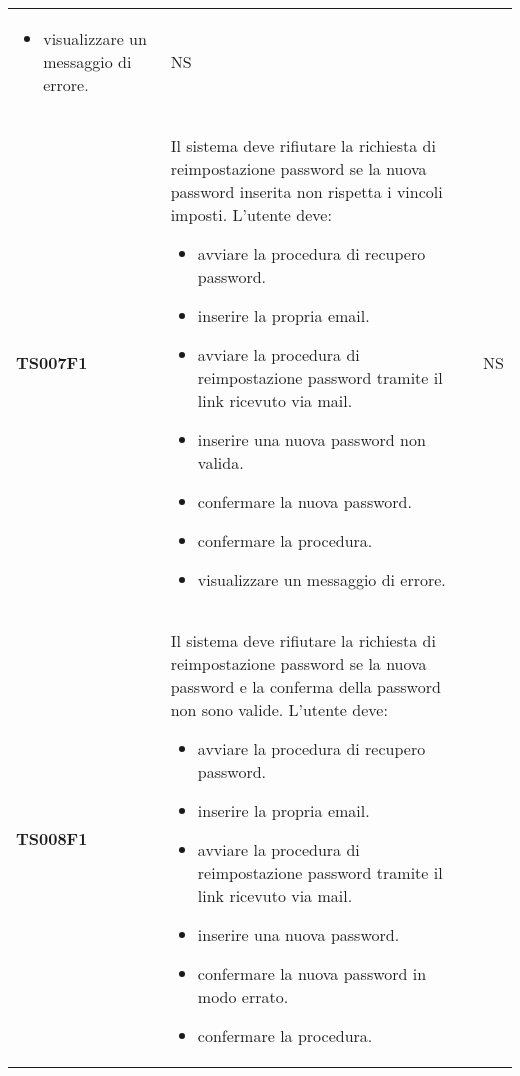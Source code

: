 \documentclass[../piano-di-qualifica.tex]{subfiles}
\begin{document}
\begin{centering}
\begin{longtable}[H]{>{\centering\bfseries}m{3cm} >{}p{10cm} >{\centering\arraybackslash}m{3cm}}
\begin{itemize}
      \item visualizzare un messaggio di errore.
    \end{itemize}
                       & NS                                                                                                                                                                                                                                                               \\
    TS007F1            & Il sistema deve rifiutare la richiesta di reimpostazione password se la nuova password inserita non rispetta i vincoli imposti. \newline
    L'utente deve:
    \begin{itemize}
      \item avviare la procedura di recupero password.
      \item inserire la propria email.
      \item avviare la procedura di reimpostazione password tramite il link ricevuto via mail.
      \item inserire una nuova password non valida.
      \item confermare la nuova password.
      \item confermare la procedura.
      \item visualizzare un messaggio di errore.
    \end{itemize}
                       & NS                                                                                                                                                                                                                                                               \\
    TS008F1            & Il sistema deve rifiutare la richiesta di reimpostazione password se la nuova password e la conferma della password non sono valide. \newline
    L'utente deve:
    \begin{itemize}
      \item avviare la procedura di recupero password.
      \item inserire la propria email.
      \item avviare la procedura di reimpostazione password tramite il link ricevuto via mail.
      \item inserire una nuova password.
      \item confermare la nuova password in modo errato.
      \item confermare la procedura.

\end{itemize}
\end{longtable}
\end{centering}
\end{document}
